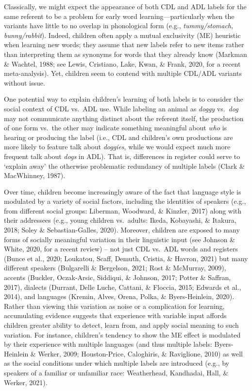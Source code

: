 \documentclass[10pt, letterpaper]{article}
\begin{document}
Classically, we might expect the appearance of both CDL and ADL labels
for the same referent to be a problem for early word
learning---particularly when the variants have little to no overlap in
phonological form (e.g., \emph{tummy/stomach}, \emph{bunny/rabbit}).
Indeed, children often apply a mutual exclusivity (ME) heuristic when
learning new words; they assume that new labels refer to new items
rather than interpreting them as synonyms for words that they already
know (Markman \& Wachtel, 1988; see Lewis, Cristiano, Lake, Kwan, \&
Frank, 2020, for a recent meta-analysis). Yet, children seem to contend
with multiple CDL/ADL variants without issue.

One potential way to explain children's learning of both labels is to
consider the social context of CDL vs.~ADL use. While labeling an animal
as \emph{doggy} vs.~\emph{dog} may not communicate anything distinct
about the referent itself, the production of one form vs.~the other may
indicate something meaningful about \emph{who} is hearing or producing
the label (i.e., CDL and children's own productions are more likely to
feature talk about \emph{doggies}, while we would expect much more
frequent talk about \emph{dogs} in ADL). That is, differences in
register could serve to `explain away' the otherwise problematic
redundancy of multiple labels (Clark \& MacWhinney, 1987).

Over time, children become increasingly aware of the fact that language
style is modulated by a variety of social factors, including the
identities of speakers (e.g., from different social groups: Liberman,
Woodward, \& Kinzler, 2017) along with their addressees (e.g., young
children vs.~adults: Ikeda, Kobayashi, \& Itakura, 2018; Soley \&
Sebastian-Galles, 2020). Moreover, children are exposed to many forms of
socially meaningful variation in their linguistic input (see Johnson \&
White, 2020, for a recent review) -- not just CDL vs.~ADL words and
registers (Bunce et al., 2020; Loukatou, Scaff, Demuth, Cristia, \&
Havron, 2021) but many different speakers (Bulgarelli \& Bergelson,
2021; Rost \& McMurray, 2009), accents (Buckler, Oczak-Arsic, Siddiqui,
\& Johnson, 2017; Potter \& Saffran, 2017), dialects (Durrant, Delle
Luche, Cattani, \& Floccia, 2015; Edwards et al., 2014), and languages
(Kremin, Alves, Orena, Polka, \& Byers-Heinlein, 2020). Rather than
viewing this variation as noise or a complication for learning,
accumulating evidence suggests that experience with variable input
affords children greater ability to detect, learn from, and apply social
meaning to such variation. For instance, children's tendency to show the
ME effect is modulated by their experience with multiple languages (and
thus multiple labels: Byers-Heinlein \& Werker, 2009; Houston-Price,
Caloghiris, \& Raviglione, 2010) as well as the social conditions under
which multiple labels are introduced (e.g., by speakers of a familiar or
unfamiliar race: Weatherhead, Kandhadai, Hall, \& Werker, 2021).
\end{document}
